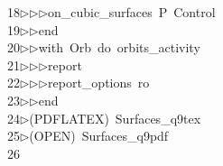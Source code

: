 \begin{tabbing}
18\>$\triangleright$\>$\triangleright$\>$\triangleright$\>on\_cubic\_surfaces\ P\ Control\ \\[0pt]
19\>$\triangleright$\>$\triangleright$\>end\ \\[0pt]
20\>$\triangleright$\>$\triangleright$\>with\ Orb\ do\ orbits\_activity\ \\[0pt]
21\>$\triangleright$\>$\triangleright$\>$\triangleright$\>report\ \\[0pt]
22\>$\triangleright$\>$\triangleright$\>$\triangleright$\>report\_options\ ro\ \\[0pt]
23\>$\triangleright$\>$\triangleright$\>end\\[0pt]
24\>$\triangleright$\>(PDFLATEX)\ Surfaces\_q9tex\ \\[0pt]
25\>$\triangleright$\>(OPEN)\ Surfaces\_q9pdf\\[0pt]
26\>\end{tabbing}
